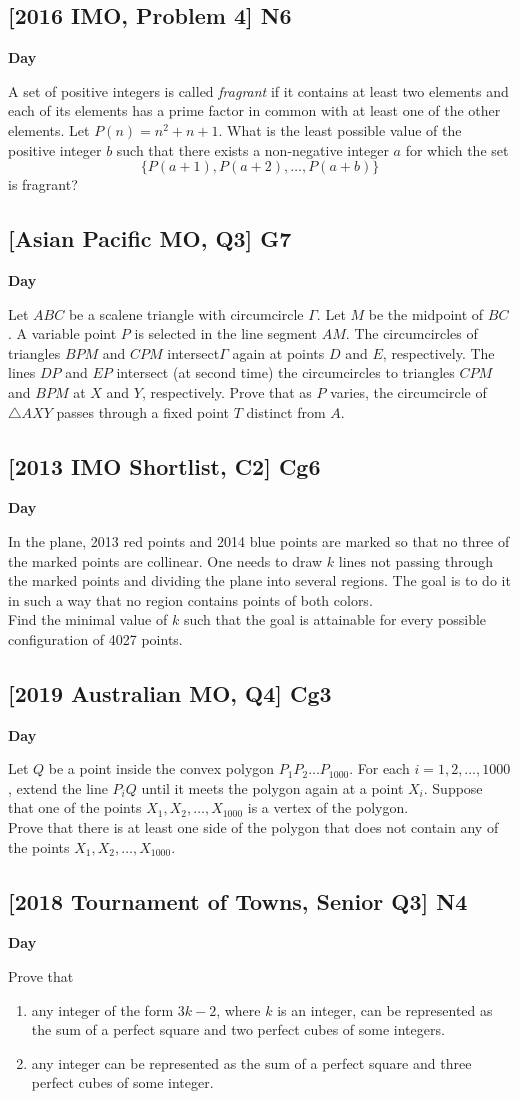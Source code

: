 \documentclass[10pt]{article}
\newcommand{\themonth}{March}
\newcommand{\theyear}{2019}
\newcounter{day}
\newcounter{solution}
\newcounter{datenumber}
\newcommand{\problem}[4][0]{
	\newpage
	\subsection{[#3] \space #2} \hfill 
	{\large\textbf{Day \arabic{day}}} %
	\begin{flushleft} #4 \end{flushleft}
	\vspace{1em}
	\addtocounter{day}{1}
	\addtocounter{datenumber}{1}
	\setcounter{solution}{1}
}
\begin{document}
\problem[100]{N6}{2016 IMO, Problem 4}{A set of positive integers is called \textit{fragrant} if it contains at least two elements and each of its elements has a prime factor in common with at least one of the other elements. Let \(P(n) = n^2 + n + 1.\) What is the least possible value of the positive integer \(b\) such that there exists a non-negative integer \(a\) for which the set
	\[\{P\left(a+1\right), P\left(a+2\right), \dots, P\left(a+b\right)\}\]
	is fragrant?}

\problem[101]{G7}{Asian Pacific MO, Q3}{Let \(ABC\) be a scalene triangle with circumcircle $\Gamma{}$. Let \(M\) be the midpoint of \(BC\). A variable point \(P\) is selected in the line segment \(AM\). The circumcircles of triangles $BPM$ and $CPM$ intersect$ \Gamma{}$ again at points $D$ and $E$, respectively. The lines $DP$ and $EP$ intersect (at second time) the circumcircles to triangles $CPM$ and $BPM$ at $X$ and $Y$, respectively. Prove that as $P$ varies, the circumcircle of $\triangle AXY$ passes through a fixed point $T$ distinct from $A$. }

\problem[102]{Cg6}{2013 IMO Shortlist, C2}{In the plane, 2013 red points and 2014 blue points are marked so that no three of the marked points are collinear. One needs to draw \(k\) lines not passing through the marked points and dividing the plane into several regions. The goal is to do it in such a way that no region contains points of both colors.\\
	Find the minimal value of \(k\) such that the goal is attainable for every possible configuration of 4027 points.}

\problem[103]{Cg3}{2019 Australian MO, Q4}{Let \(Q\) be a point inside the convex polygon \(P_1 P_2 \dots P_{1000}\). For each \(i=1, 2, \dots, 1000\), extend the line \(P_i Q\) until it meets the polygon again at a point \(X_i\). Suppose that one of the points \(X_1, X_2, \dots, X_{1000}\) is a vertex of the polygon.\\
\makebox[16pt]{}Prove that there is at least one side of the polygon that does not contain any of the points \(X_1, X_2, \dots, X_{1000}\).}

\problem[104]{N4}{2018 Tournament of Towns, Senior Q3}{Prove that\\
	\begin{enumerate}
		\item any integer of the form \(3k-2\), where \(k\) is an integer, can be represented as the sum of a perfect square and two perfect cubes of some integers.
		\item any integer can be represented as the sum of a perfect square and three perfect cubes of some integer.
	\end{enumerate}}
\end{document}
